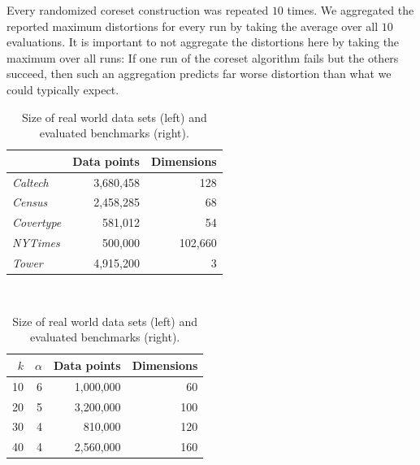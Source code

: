 Every randomized coreset construction was repeated $10$ times. We aggregated the reported maximum distortions for every run by taking the average over all $10$ evaluations. 
It is important to not aggregate the distortions here by taking the maximum over all runs: If one run of the coreset algorithm fails but the others succeed, then such an aggregation predicts far worse distortion than what we could typically expect.


\begin{center}
\begin{table}
\begin{minipage}{0.5\textwidth}
	\begin{tabular}{lrr}
		\toprule
        
		    & Data points
		    & Dimensions
            \\
		\midrule
		\textit{Caltech}
    		& 3,680,458
    		& 128
    		\\
		\textit{Census}
    		& 2,458,285
    		& 68
    		\\
	    \textit{Covertype}
    	    & 581,012
    		& 54
    		\\
	    \textit{NYTimes}
    	    & 500,000
    		& 102,660
    		\\
        \textit{Tower}
            & 4,915,200
    		& 3
    		\\
		\bottomrule
	\end{tabular}\\
\end{minipage}
\begin{minipage}{0.5\textwidth}
	\begin{tabular}{rrrr}
		\toprule
        $k$
		    & $\alpha$
		    & Data points
		    & Dimensions
            \\
		\midrule
        10
    		& 6
    		& 1,000,000
    		& 60
    		\\
        20
    		& 5
    		& 3,200,000
    		& 100
    		\\
        30
    		& 4
    		& 810,000
    		& 120
    		\\
        40
    		& 4
    		& 2,560,000
    		& 160
    		\\
		\bottomrule
	\end{tabular}\\
\end{minipage}
\caption{Size of real world data sets (left) and evaluated benchmarks (right).}
\label{tab:real-world-datasets-overview}
\end{table}
\end{center}
\vspace{-1.5cm}
